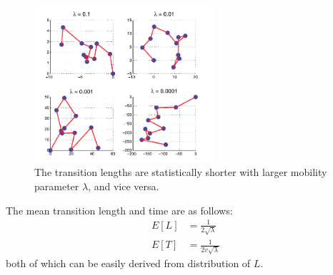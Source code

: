 \begin{figure}[h]
    \centering \vspace{-0.1in}
    \includegraphics[width=0.6\textwidth]{images/rwpTraces.png}
    \vspace{-20pt} \caption[Sample traces of rayleigh RWP mobility model]{\small The transition	lengths are statistically shorter with larger mobility parameter $\lambda$, and vice
	versa.\footnotemark}
    \label{fig:rwp}
\end{figure}
The mean transition length and time are as follows:
\begin{align}
	E[L] &= \frac{1}{2\sqrt{\lambda}} \\[2ex]
	E[T] &= \frac{1}{2v\sqrt{\lambda}}
\end{align}
both of which can be easily derived from distribution of $L$.
